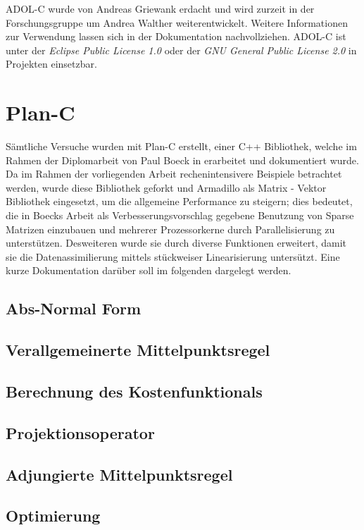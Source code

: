 ADOL-C wurde von Andreas Griewank erdacht und wird zurzeit in der Forschungsgruppe um Andrea Walther weiterentwickelt. Weitere Informationen zur Verwendung lassen sich in der Dokumentation \cite{walther2012getting} nachvollziehen. ADOL-C ist unter der \textit{Eclipse Public License 1.0} oder der \textit{GNU General Public License 2.0} in Projekten einsetzbar.

\section{Plan-C}
Sämtliche Versuche wurden mit Plan-C erstellt, einer C++ Bibliothek, welche im Rahmen der Diplomarbeit von Paul Boeck in \cite{boeck14} erarbeitet und dokumentiert wurde. Da im Rahmen der vorliegenden Arbeit rechenintensivere Beispiele betrachtet werden, wurde diese Bibliothek geforkt und Armadillo als Matrix - Vektor Bibliothek eingesetzt, um die allgemeine Performance zu steigern; dies bedeutet, die in Boecks Arbeit als Verbesserungsvorschlag gegebene Benutzung von Sparse Matrizen einzubauen und mehrerer Prozessorkerne durch Parallelisierung zu unterstützen.  Desweiteren wurde sie durch diverse Funktionen erweitert, damit sie die Datenassimilierung mittels stückweiser Linearisierung untersützt. Eine kurze Dokumentation darüber soll im folgenden dargelegt werden.

\subsection{Abs-Normal Form}

\subsection{Verallgemeinerte Mittelpunktsregel}

\subsection{Berechnung des Kostenfunktionals}
\subsection{Projektionsoperator}

\subsection{Adjungierte Mittelpunktsregel}


\subsection{Optimierung}